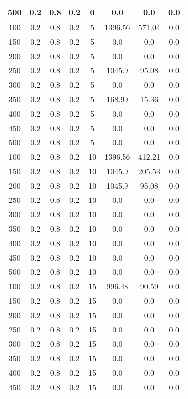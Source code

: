 \documentclass[a4paper, 12pt]{extreport}
\begin{document}
\begin{itemize}
\begin{longtable}{|c|c|c|c|c|c|c|c|}
			500 & 0.2 & 0.8 & 0.2 & 0 & 0.0 & 0.0 & 0.0 \\\hline
			100 & 0.2 & 0.8 & 0.2 & 5 & 1396.56 & 571.04 & 0.0 \\\hline
			150 & 0.2 & 0.8 & 0.2 & 5 & 0.0 & 0.0 & 0.0 \\\hline
			200 & 0.2 & 0.8 & 0.2 & 5 & 0.0 & 0.0 & 0.0 \\\hline
			250 & 0.2 & 0.8 & 0.2 & 5 & 1045.9 & 95.08 & 0.0 \\\hline
			300 & 0.2 & 0.8 & 0.2 & 5 & 0.0 & 0.0 & 0.0 \\\hline
			350 & 0.2 & 0.8 & 0.2 & 5 & 168.99 & 15.36 & 0.0 \\\hline
			400 & 0.2 & 0.8 & 0.2 & 5 & 0.0 & 0.0 & 0.0 \\\hline
			450 & 0.2 & 0.8 & 0.2 & 5 & 0.0 & 0.0 & 0.0 \\\hline
			500 & 0.2 & 0.8 & 0.2 & 5 & 0.0 & 0.0 & 0.0 \\\hline
			100 & 0.2 & 0.8 & 0.2 & 10 & 1396.56 & 412.21 & 0.0 \\\hline
			150 & 0.2 & 0.8 & 0.2 & 10 & 1045.9 & 205.53 & 0.0 \\\hline
			200 & 0.2 & 0.8 & 0.2 & 10 & 1045.9 & 95.08 & 0.0 \\\hline
			250 & 0.2 & 0.8 & 0.2 & 10 & 0.0 & 0.0 & 0.0 \\\hline
			300 & 0.2 & 0.8 & 0.2 & 10 & 0.0 & 0.0 & 0.0 \\\hline
			350 & 0.2 & 0.8 & 0.2 & 10 & 0.0 & 0.0 & 0.0 \\\hline
			400 & 0.2 & 0.8 & 0.2 & 10 & 0.0 & 0.0 & 0.0 \\\hline
			450 & 0.2 & 0.8 & 0.2 & 10 & 0.0 & 0.0 & 0.0 \\\hline
			500 & 0.2 & 0.8 & 0.2 & 10 & 0.0 & 0.0 & 0.0 \\\hline
			100 & 0.2 & 0.8 & 0.2 & 15 & 996.48 & 90.59 & 0.0 \\\hline
			150 & 0.2 & 0.8 & 0.2 & 15 & 0.0 & 0.0 & 0.0 \\\hline
			200 & 0.2 & 0.8 & 0.2 & 15 & 0.0 & 0.0 & 0.0 \\\hline
			250 & 0.2 & 0.8 & 0.2 & 15 & 0.0 & 0.0 & 0.0 \\\hline
			300 & 0.2 & 0.8 & 0.2 & 15 & 0.0 & 0.0 & 0.0 \\\hline
			350 & 0.2 & 0.8 & 0.2 & 15 & 0.0 & 0.0 & 0.0 \\\hline
			400 & 0.2 & 0.8 & 0.2 & 15 & 0.0 & 0.0 & 0.0 \\\hline
			450 & 0.2 & 0.8 & 0.2 & 15 & 0.0 & 0.0 & 0.0 \\\hline

\end{longtable}
\end{itemize}
\end{document}
